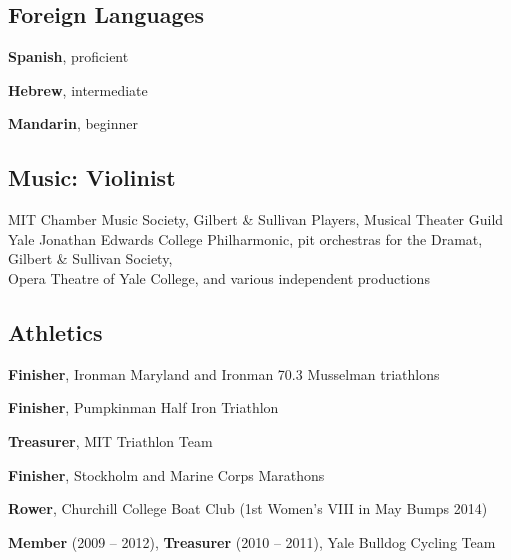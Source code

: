 \subsection{Foreign Languages}
{}{\textbf{Spanish}, proficient}{}

{}{\textbf{Hebrew}, intermediate}{}

{}{\textbf{Mandarin}, beginner}{}

\subsection{Music: Violinist}
{MIT}
{Chamber Music Society, Gilbert \& Sullivan Players, Musical Theater Guild}{}
{Yale}
{Jonathan Edwards College Philharmonic, pit orchestras for the Dramat, Gilbert \& Sullivan Society,\\Opera Theatre of Yale College, and various independent productions}{}

\subsection{Athletics}
{}{\textbf{Finisher}, Ironman Maryland and Ironman 70.3 Musselman triathlons}{}

{}{\textbf{Finisher}, Pumpkinman Half Iron Triathlon}{}

{}{\textbf{Treasurer}, MIT Triathlon Team}{}

{}{\textbf{Finisher}, Stockholm and Marine Corps Marathons}{}

{}{\textbf{Rower}, Churchill College Boat Club (1st Women's VIII in May Bumps 2014)}{}

{}{\textbf{Member} (2009 -- 2012), \textbf{Treasurer} (2010 -- 2011), Yale Bulldog Cycling Team}{}